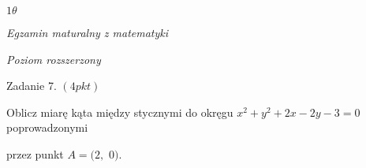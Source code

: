 \documentclass[a4paper,12pt]{article}
\begin{document}
$ 1\theta$

{\it Egzamin maturalny z matematyki}

{\it Poziom rozszerzony}

Zadanie 7. $(4pkt)$

Oblicz miarę kąta między stycznymi do okręgu $x^{2}+y^{2}+2x-2y-3=0$ poprowadzonymi

przez punkt $A=(2,$ 0$).$
\end{document}
